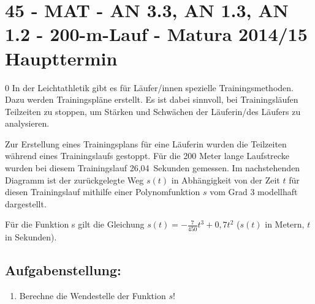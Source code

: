 \section{45 - MAT - AN 3.3, AN 1.3, AN 1.2 - 200-m-Lauf - Matura 2014/15 Haupttermin}

\begin{langesbeispiel} \item[0] %
				 In der Leichtathletik gibt es für Läufer/innen spezielle Trainingsmethoden. Dazu werden Trainingspläne erstellt. Es ist dabei sinnvoll, bei Trainingsläufen Teilzeiten zu stoppen, um Stärken und Schwächen der Läuferin/des Läufers zu analysieren.
				
				Zur Erstellung eines Trainingsplans für eine Läuferin wurden die Teilzeiten während eines Trainingslaufs gestoppt. Für die 200 Meter lange Laufstrecke wurden bei diesem Trainingslauf 26,04 Sekunden gemessen. Im nachstehenden Diagramm ist der zurückgelegte Weg $s(t)$ in Abhängigkeit von der Zeit $t$ für diesen Trainingslauf mithilfe einer Polynomfunktion $s$ vom Grad 3 modellhaft dargestellt. 
				
Für die Funktion s gilt die Gleichung $s(t)=-\frac{7}{450}t^3+0,7t^2$ ($s(t)$ in Metern, $t$ in Sekunden).

\begin{center}
\end{center}

\subsection{Aufgabenstellung:}
\begin{enumerate}
	\item Berechne die Wendestelle der Funktion $s$!
	

\end{enumerate}
\end{langesbeispiel}
